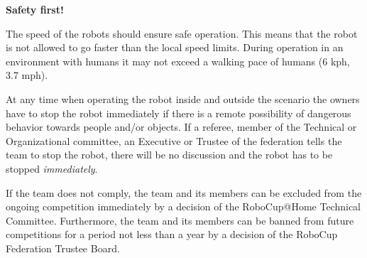 \vspace{1 em}

\noindent\textbf{Safety first!}

\noindent The speed of the robots should ensure safe operation. 
This means that the robot is not allowed to go faster than the local speed limits. 
During operation in an environment with humans it may not exceed a walking pace of humans (6 kph, 3.7 mph). 

At any time when operating the robot inside and outside the scenario the 
owners have to stop the robot immediately if there is a remote possibility 
of dangerous behavior towards people and/or objects. If a referee, member 
of the Technical or Organizational committee, an Executive or Trustee of 
the federation tells the team to stop the robot, there will be no discussion 
and the robot has to be stopped \emph{immediately}.

If the team does not comply, the team and its members can be excluded from 
the ongoing competition immediately by a decision of the RoboCup@Home Technical 
Committee. 
Furthermore, the team and its members can be banned from future competitions 
for a period not less than a year by a decision of the RoboCup Federation 
Trustee Board.

\vspace{1cm}

